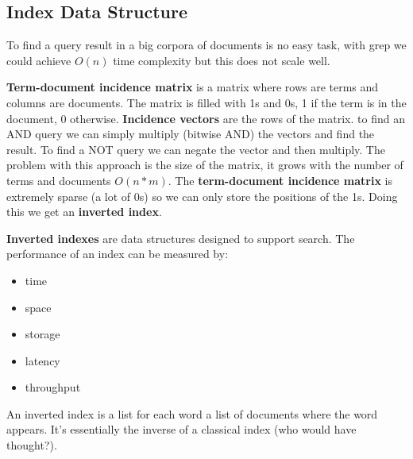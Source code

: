 \subsection{Index Data Structure}
\label{sec:index_data_structure}

To find a query result in a big corpora of documents is
no easy task, with grep we could achieve $O(n)$ time complexity
but this does not scale well.

\textbf{Term-document incidence matrix} is a matrix where rows are
terms and columns are documents. The matrix is filled with
1s and 0s, 1 if the term is in the document, 0 otherwise.
\textbf{Incidence vectors} are the rows of the matrix.
to find an AND query we can simply multiply (bitwise AND) 
the vectors and find the result. To find a NOT query we can
negate the vector and then multiply.
The problem with this approach is the size of the matrix,
it grows with the number of terms and documents $O(n*m)$.
The \textbf{term-document incidence matrix} is extremely sparse
(a lot of 0s) so we can only store the positions of the 1s.
Doing this we get an \textbf{inverted index}.

\textbf{Inverted indexes} are data structures designed to support search.
The performance of an index can be measured by:
\begin{itemize}
    \item time
    \item space
    \item storage
    \item latency
    \item throughput
\end{itemize}
An inverted index is a list for each word a list of documents
where the word appears. It's essentially the inverse of a
classical index (who would have thought?).


